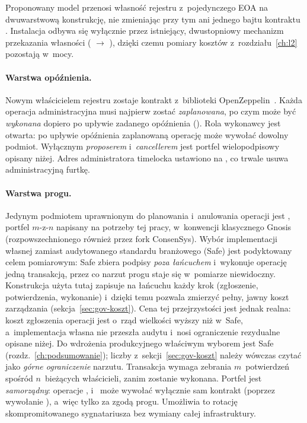 Proponowany model przenosi własność rejestru z~pojedynczego EOA na dwuwarstwową
konstrukcję, nie zmieniając przy tym ani jednego bajtu kontraktu
. Instalacja odbywa się wyłącznie przez istniejący,
dwustopniowy mechanizm przekazania własności
( $\rightarrow$ ), dzięki czemu
pomiary kosztów z~rozdziału~\ref{ch:l2} pozostają w~mocy.

\paragraph{Warstwa opóźnienia.} Nowym właścicielem rejestru zostaje kontrakt
 z~biblioteki OpenZeppelin~\cite{oz-contracts}. Każda
operacja administracyjna musi najpierw zostać \emph{zaplanowana}, po czym może być
\emph{wykonana} dopiero po upływie zadanego opóźnienia (). Rola
wykonawcy jest otwarta: po upływie opóźnienia zaplanowaną operację może wywołać
dowolny podmiot. Wyłącznym \emph{proposerem} i~\emph{cancellerem} jest
portfel wielopodpisowy opisany niżej. Adres administratora timelocka ustawiono na
, co trwale usuwa administracyjną furtkę.

\paragraph{Warstwa progu.} Jedynym podmiotem uprawnionym do planowania
i~anulowania operacji jest , portfel $m$-z-$n$ napisany
na potrzeby tej pracy, w~konwencji klasycznego 
Gnosis~\cite{gnosis-multisig} (rozpowszechnionego również przez fork
ConsenSys). Wybór implementacji własnej zamiast
audytowanego standardu branżowego (Safe) jest podyktowany celem pomiarowym:
Safe zbiera podpisy \emph{poza łańcuchem} i~wykonuje operację jedną transakcją,
przez co narzut progu staje się w~pomiarze niewidoczny. Konstrukcja użyta tutaj
zapisuje na łańcuchu każdy krok (zgłoszenie, potwierdzenia, wykonanie)
i~dzięki temu pozwala zmierzyć pełny, jawny koszt zarządzania
(sekcja~\ref{sec:gov-koszt}). Cena tej przejrzystości jest jednak realna: koszt
zgłoszenia operacji jest o~rząd wielkości wyższy niż w~Safe, a~implementacja
własna nie przeszła audytu i~nosi ograniczenie rezydualne opisane niżej. Do
wdrożenia produkcyjnego właściwym wyborem jest Safe
(rozdz.~\ref{ch:podsumowanie}); liczby z~sekcji~\ref{sec:gov-koszt} należy wówczas
czytać jako \emph{górne ograniczenie} narzutu. Transakcja wymaga zebrania $m$~potwierdzeń
spośród $n$~bieżących właścicieli, zanim zostanie wykonana. Portfel jest
\emph{samorządny}: operacje , 
i~ może wywołać wyłącznie sam kontrakt (poprzez wywołanie
), a~więc tylko za zgodą progu. Umożliwia to rotację skompromitowanego
sygnatariusza bez wymiany całej infrastruktury.

